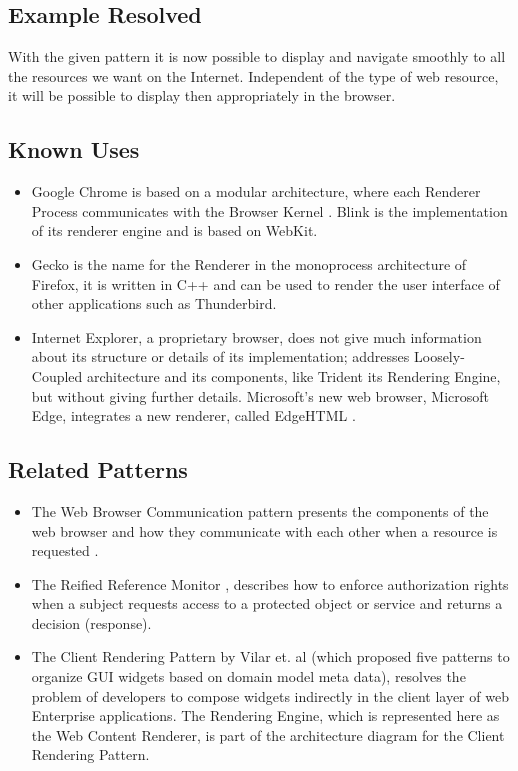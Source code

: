 \documentclass[prodmode,acmtecs]{acmsmall}
\begin{document}
  \subsection*{Example Resolved}
With the given pattern it is now possible to display and navigate smoothly to all the resources we want on the Internet. Independent of the type of web resource, it will be possible to display then appropriately in the browser. 
  \subsection*{Known Uses}
  \begin{itemize}\leftskip0.2em
    \item Google Chrome is based on a modular architecture, where each Renderer Process communicates with the Browser Kernel \cite{multiProcGC}. Blink is the implementation of its renderer engine and is based on WebKit.
    \item Gecko \cite{gecko2} is the name for the Renderer in the monoprocess architecture of Firefox, it is written in C++ and can be used to render the user interface of other applications such as Thunderbird.
    \item Internet Explorer, a proprietary browser, does not give much information about its structure or details of its implementation; \cite{Crowley2010} addresses Loosely-Coupled architecture \cite{IE8-LCIE} and its components, like Trident its Rendering Engine, but without giving further details. Microsoft's new web browser, Microsoft Edge, integrates a new renderer, called EdgeHTML \cite{edgehtml}.
  \end{itemize}

  \subsection*{Related Patterns}
  \begin{itemize}\leftskip0.2em
    \item The Web Browser Communication pattern presents the components of the web browser and how they communicate with each other when a resource is requested \cite{silva2015}. 
    \item The Reified Reference Monitor \cite{fernandez2013security}, describes how to enforce authorization rights when a subject requests access to a protected object or service and returns a decision (response). 
    \item The Client Rendering Pattern by Vilar et. al \cite{Vilar2015} (which proposed five patterns to organize GUI widgets based on domain model meta data), resolves the problem of developers to compose widgets indirectly in the client layer of web Enterprise applications. The Rendering Engine, which is represented here as the Web Content Renderer, is part of the architecture diagram for the Client Rendering Pattern.
  \end{itemize}
\end{document}

